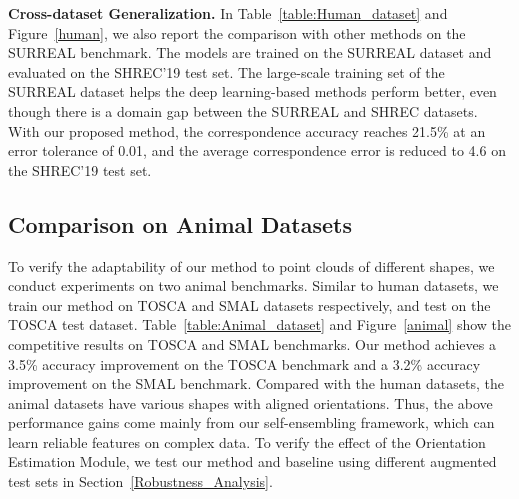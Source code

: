 \textbf{Cross-dataset Generalization.}
In Table~\ref{table:Human_dataset} and Figure~\ref{human}, we also report the comparison with other methods on the SURREAL benchmark.
The models are trained on the SURREAL dataset and evaluated on the SHREC'19 test set.
The large-scale training set of the SURREAL dataset helps the deep learning-based methods perform better, even though there is a domain gap between the SURREAL and SHREC datasets.
With our proposed method, the correspondence accuracy reaches 21.5\% at an error tolerance of 0.01, and the average correspondence error is reduced to 4.6 on the SHREC'19 test set.


\subsection{Comparison on Animal Datasets}


To verify the adaptability of our method to point clouds of different shapes, we conduct experiments on two animal benchmarks.
Similar to human datasets, we train our method on TOSCA and SMAL datasets respectively, and test on the TOSCA test dataset.
Table~\ref{table:Animal_dataset} and Figure~\ref{animal} show the competitive results on TOSCA and SMAL benchmarks.
Our method achieves a 3.5\% accuracy improvement on the TOSCA benchmark and a 3.2\% accuracy improvement on the SMAL benchmark.
Compared with the human datasets, the animal datasets have various shapes with aligned orientations.
Thus, the above performance gains come mainly from our self-ensembling framework, which can learn reliable features on complex data.
To verify the effect of the Orientation Estimation Module, we test our method and baseline using different augmented test sets in Section~\ref{Robustness_Analysis}.


